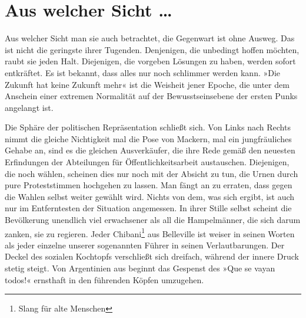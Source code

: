\section{Aus welcher Sicht \ldots{}}

Aus welcher Sicht man sie auch betrachtet, die Gegenwart ist ohne
Ausweg. Das ist nicht die geringste ihrer Tugenden. Denjenigen, die
unbedingt hoffen möchten, raubt sie jeden Halt. Diejenigen, die
vorgeben Lösungen zu haben, werden sofort entkräftet. Es ist
bekannt, dass alles nur noch schlimmer werden kann. »Die Zukunft
hat keine Zukunft mehr« ist die Weisheit jener Epoche, die unter
dem Anschein einer extremen Normalität auf der Bewusstseinsebene
der ersten Punks angelangt ist.
\extrapar{}

Die Sphäre der politischen Repräsentation schließt sich. Von Links
nach Rechts nimmt die gleiche Nichtigkeit mal die Pose von Mackern,
mal ein jungfräuliches Gehabe an, sind es die gleichen
Ausverkäufer, die ihre Rede gemäß den neuesten Erfindungen der
Abteilungen für Öffentlichkeitsarbeit austauschen. Diejenigen, die
noch wählen, scheinen dies nur noch mit der Absicht zu tun, die
Urnen durch pure Proteststimmen hochgehen zu lassen. Man fängt an
zu erraten, dass gegen die Wahlen selbst weiter gewählt wird.
Nichts von dem, was sich ergibt, ist auch nur im Entferntesten der
Situation angemessen. In ihrer Stille selbst scheint die
Bevölkerung unendlich viel erwachsener als all die Hampelmänner,
die sich darum zanken, sie zu regieren. Jeder Chibani\footnote{
Slang für alte Menschen
}
aus
Belleville ist weiser in seinen Worten als jeder einzelne unserer
sogenannten Führer in seinen Verlautbarungen. Der Deckel des
sozialen Kochtopfs verschließt sich dreifach, während der innere
Druck stetig steigt. Von Argentinien aus beginnt das Gespenst des
»Que se vayan todos!« ernsthaft in den führenden Köpfen umzugehen.
\extrapar{}

